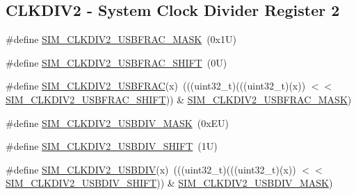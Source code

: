 \subsection*{C\+L\+K\+D\+I\+V2 -\/ System Clock Divider Register 2}
\begin{DoxyCompactItemize}
\item 
\#define \mbox{\hyperlink{group___s_i_m___register___masks_gab0c8e972a7c3831440784c5293a5d5f0}{S\+I\+M\+\_\+\+C\+L\+K\+D\+I\+V2\+\_\+\+U\+S\+B\+F\+R\+A\+C\+\_\+\+M\+A\+SK}}~(0x1\+U)
\item 
\#define \mbox{\hyperlink{group___s_i_m___register___masks_ga01ab71acec84c43fdb78e81f7f8e554a}{S\+I\+M\+\_\+\+C\+L\+K\+D\+I\+V2\+\_\+\+U\+S\+B\+F\+R\+A\+C\+\_\+\+S\+H\+I\+FT}}~(0\+U)
\item 
\#define \mbox{\hyperlink{group___s_i_m___register___masks_ga411d305ad948e5c97bbebb5c234647a2}{S\+I\+M\+\_\+\+C\+L\+K\+D\+I\+V2\+\_\+\+U\+S\+B\+F\+R\+AC}}(x)~(((uint32\+\_\+t)(((uint32\+\_\+t)(x)) $<$$<$ \mbox{\hyperlink{group___s_i_m___register___masks_ga01ab71acec84c43fdb78e81f7f8e554a}{S\+I\+M\+\_\+\+C\+L\+K\+D\+I\+V2\+\_\+\+U\+S\+B\+F\+R\+A\+C\+\_\+\+S\+H\+I\+FT}})) \& \mbox{\hyperlink{group___s_i_m___register___masks_gab0c8e972a7c3831440784c5293a5d5f0}{S\+I\+M\+\_\+\+C\+L\+K\+D\+I\+V2\+\_\+\+U\+S\+B\+F\+R\+A\+C\+\_\+\+M\+A\+SK}})
\item 
\#define \mbox{\hyperlink{group___s_i_m___register___masks_gaebed7d452e72dd54cb74783b61c64447}{S\+I\+M\+\_\+\+C\+L\+K\+D\+I\+V2\+\_\+\+U\+S\+B\+D\+I\+V\+\_\+\+M\+A\+SK}}~(0x\+E\+U)
\item 
\#define \mbox{\hyperlink{group___s_i_m___register___masks_gaa085ff25a9d47eecd8a51517fc80778b}{S\+I\+M\+\_\+\+C\+L\+K\+D\+I\+V2\+\_\+\+U\+S\+B\+D\+I\+V\+\_\+\+S\+H\+I\+FT}}~(1\+U)
\item 
\#define \mbox{\hyperlink{group___s_i_m___register___masks_ga0b9ec974c8ad543809fa83a73e7883a2}{S\+I\+M\+\_\+\+C\+L\+K\+D\+I\+V2\+\_\+\+U\+S\+B\+D\+IV}}(x)~(((uint32\+\_\+t)(((uint32\+\_\+t)(x)) $<$$<$ \mbox{\hyperlink{group___s_i_m___register___masks_gaa085ff25a9d47eecd8a51517fc80778b}{S\+I\+M\+\_\+\+C\+L\+K\+D\+I\+V2\+\_\+\+U\+S\+B\+D\+I\+V\+\_\+\+S\+H\+I\+FT}})) \& \mbox{\hyperlink{group___s_i_m___register___masks_gaebed7d452e72dd54cb74783b61c64447}{S\+I\+M\+\_\+\+C\+L\+K\+D\+I\+V2\+\_\+\+U\+S\+B\+D\+I\+V\+\_\+\+M\+A\+SK}})
\end{DoxyCompactItemize}
